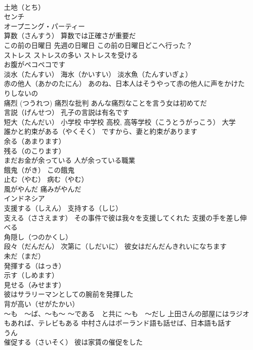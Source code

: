\documentclass[8pt]{extreport}
\begin{document}
\begin{CJK}{UTF8}{min}
\\	土地（とち） 
\\	センチ
\\	オープニング・パーティー
\\	算数（さんすう） 算数では正確さが重要だ
\\	この前の日曜日 先週の日曜日 この前の日曜日どこへ行った？
\\	ストレス ストレスの多い ストレスを受ける
\\	お腹がペコペコです
\\	淡水（たんすい） 海水（かいすい） 淡水魚（たんすいぎょ）
\\	赤の他人（あかのたにん） あのね、日本人はそうやって赤の他人に声をかけたりしないの
\\	痛烈 (つうれつ) 痛烈な批判 あんな痛烈なことを言う女は初めてだ
\\	言説（げんせつ） 孔子の言説は有名です
\\	短大（たんだい） 小学校 中学校 高校, 高等学校（こうとうがっこう） 大学
\\	誰かと約束がある（やくそく） ですから、妻と約束があります
\\	余る（あまります） 
\\	残る（のこります）
\\	まだお金が余っている 人が余っている職業
\\	餓鬼（がき） この餓鬼
\\	止む（やむ） 病む（やむ）
\\	風がやんだ 痛みがやんだ
\\	インドネシア
\\	支援する（しえん） 支持する（しじ）
\\	支える（ささえます） その事件で彼は我々を支援してくれた 支援の手を差し伸べる
\\	角隠し（つのかくし）
\\	段々（だんだん） 次第に（しだいに） 彼女はだんだんきれいになちます
\\	未だ（まだ）
\\	発揮する（はっき）
\\	示す（しめます）
\\	見せる（みせます）
\\	彼はサラリーマンとしての腕前を発揮した
\\	背が高い（せがたかい）
\\	～も　～ば、～も～ ～である　と共に ～も　～だし 上田さんの部屋にはラジオもあれば、テレビもある 中村さんはポーランド語も話せば、日本語も話す
\\	うん
\\	催促する（さいそく） 彼は家賃の催促をした

\end{CJK}
\end{document}
